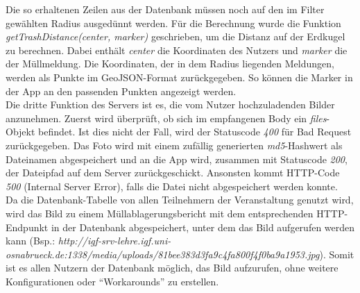 \documentclass[a4paper, 11pt, DIV=11, listof=numbered, numbers=noenddot]{scrartcl}
\begin{document}
	Die so erhaltenen Zeilen aus der Datenbank müssen noch auf den im Filter gewählten Radius ausgedünnt werden. Für die Berechnung wurde die Funktion \textit{getTrashDistance(center, marker)} geschrieben, um die Distanz auf der Erdkugel zu berechnen. Dabei enthält \textit{center} die Koordinaten des Nutzers und \textit{marker} die der Müllmeldung. Die Koordinaten, der in dem Radius liegenden Meldungen, werden als Punkte im GeoJSON-Format zurückgegeben. So können die Marker in der App an den passenden Punkten angezeigt werden.\\
	Die dritte Funktion des Servers ist es, die vom Nutzer hochzuladenden Bilder anzunehmen. Zuerst wird überprüft, ob sich im empfangenen Body ein \textit{files}-Objekt befindet. Ist dies nicht der Fall, wird der Statuscode \textit{400} für Bad Request zurückgegeben. Das Foto wird mit einem zufällig generierten \textit{md5}-Hashwert als Dateinamen abgespeichert und an die App wird, zusammen mit Statuscode \textit{200}, der Dateipfad auf dem Server zurückgeschickt. Ansonsten kommt HTTP-Code \textit{500} (Internal Server Error), falls die Datei nicht abgespeichert werden konnte.\\
	Da die Datenbank-Tabelle von allen Teilnehmern der Veranstaltung genutzt wird, wird das Bild zu einem Müllablagerungsbericht mit dem entsprechenden HTTP-Endpunkt in der Datenbank abgespeichert, unter dem das Bild aufgerufen werden kann (Bsp.: \textit{http://igf-srv-lehre.igf.uni-osnabrueck.de:1338/media/uploads/81bee383d3fa9c4fa800f4f0ba9a1953.jpg}). Somit ist es allen Nutzern der Datenbank möglich, das Bild aufzurufen, ohne weitere Konfigurationen oder \enquote{Workarounds} zu erstellen.
\end{document}
